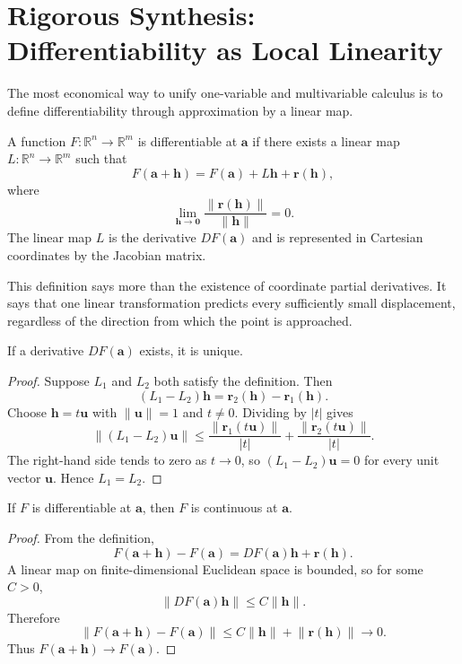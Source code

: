 \section{Rigorous Synthesis: Differentiability as Local Linearity}
\label{sec:differentiability-local-linearity}

The most economical way to unify one-variable and multivariable calculus is to define differentiability through approximation by a linear map.

\begin{bookdefinition}
A function $F:\mathbb R^n\to\mathbb R^m$ is differentiable at $\mathbf a$ if there exists a linear map $L:\mathbb R^n\to\mathbb R^m$ such that
\[
F(\mathbf a+\mathbf h)=F(\mathbf a)+L\mathbf h+\mathbf r(\mathbf h),
\]
where
\[
\lim_{\mathbf h\to\mathbf0}\frac{\lVert\mathbf r(\mathbf h)\rVert}{\lVert\mathbf h\rVert}=0.
\]
The linear map $L$ is the derivative $DF(\mathbf a)$ and is represented in Cartesian coordinates by the Jacobian matrix.
\end{bookdefinition}

This definition says more than the existence of coordinate partial derivatives. It says that one linear transformation predicts every sufficiently small displacement, regardless of the direction from which the point is approached.

\begin{bookproperty}
If a derivative $DF(\mathbf a)$ exists, it is unique.
\end{bookproperty}

\begin{proof}
Suppose $L_1$ and $L_2$ both satisfy the definition. Then
\[
(L_1-L_2)\mathbf h=\mathbf r_2(\mathbf h)-\mathbf r_1(\mathbf h).
\]
Choose $\mathbf h=t\mathbf u$ with $\lVert\mathbf u\rVert=1$ and $t\neq0$. Dividing by $|t|$ gives
\[
\lVert(L_1-L_2)\mathbf u\rVert
\leq
\frac{\lVert\mathbf r_1(t\mathbf u)\rVert}{|t|}
+
\frac{\lVert\mathbf r_2(t\mathbf u)\rVert}{|t|}.
\]
The right-hand side tends to zero as $t\to0$, so $(L_1-L_2)\mathbf u=0$ for every unit vector $\mathbf u$. Hence $L_1=L_2$.
\end{proof}

\begin{bookproperty}
If $F$ is differentiable at $\mathbf a$, then $F$ is continuous at $\mathbf a$.
\end{bookproperty}

\begin{proof}
From the definition,
\[
F(\mathbf a+\mathbf h)-F(\mathbf a)=DF(\mathbf a)\mathbf h+\mathbf r(\mathbf h).
\]
A linear map on finite-dimensional Euclidean space is bounded, so for some $C>0$,
\[
\lVert DF(\mathbf a)\mathbf h\rVert\leq C\lVert\mathbf h\rVert.
\]
Therefore
\[
\lVert F(\mathbf a+\mathbf h)-F(\mathbf a)\rVert
\leq C\lVert\mathbf h\rVert+\lVert\mathbf r(\mathbf h)\rVert\to0.
\]
Thus $F(\mathbf a+\mathbf h)\to F(\mathbf a)$.
\end{proof}


